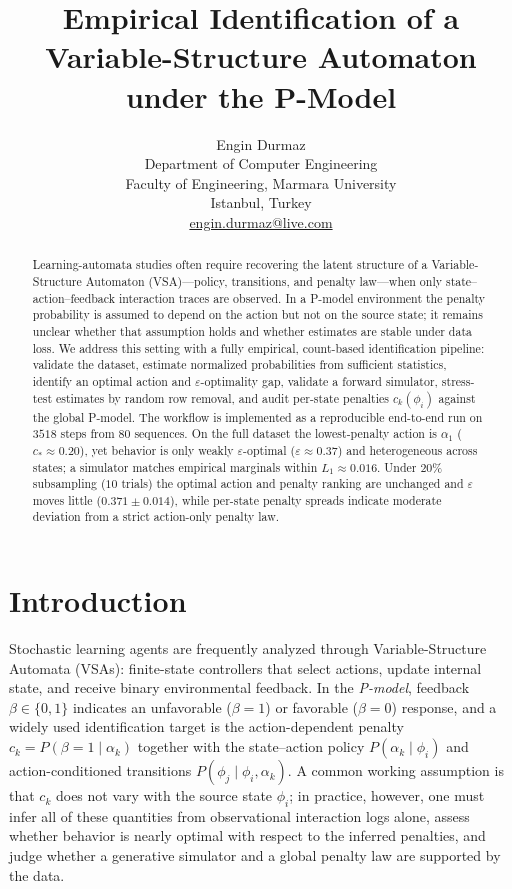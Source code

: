 \documentclass[11pt,a4paper]{article}
\title{Empirical Identification of a Variable-Structure Automaton under the P-Model}
\author{Engin Durmaz\\[0.4em]
  Department of Computer Engineering\\
  Faculty of Engineering, Marmara University\\
  Istanbul, Turkey\\[0.3em]
  \href{mailto:engin.durmaz@live.com}{engin.durmaz@live.com}}
\date{}
\begin{document}
\maketitle

\begin{abstract}
Learning-automata studies often require recovering the latent structure of a
Variable-Structure Automaton (VSA)---policy, transitions, and penalty
law---when only state--action--feedback interaction traces are observed. In a
P-model environment the penalty probability is assumed to depend on the action
but not on the source state; it remains unclear whether that assumption holds and
whether estimates are stable under data loss. We address this setting with a fully
empirical, count-based identification pipeline: validate the dataset, estimate
normalized probabilities from sufficient statistics, identify an optimal action and
$\varepsilon$-optimality gap, validate a forward simulator, stress-test estimates
by random row removal, and audit per-state penalties $c_k(\phi_i)$ against the
global P-model. The workflow is implemented as a reproducible end-to-end run on
$3518$ steps from $80$ sequences. On the full dataset the lowest-penalty action
is $\alpha_1$ ($c_\ast\approx 0.20$), yet behavior is only weakly
$\varepsilon$-optimal ($\varepsilon\approx 0.37$) and heterogeneous across states;
a simulator matches empirical marginals within $L_1\approx 0.016$. Under $20\%$
subsampling ($10$ trials) the optimal action and penalty ranking are unchanged and
$\varepsilon$ moves little ($0.371\pm 0.014$), while per-state penalty spreads
indicate moderate deviation from a strict action-only penalty law.
\end{abstract}

\section{Introduction}

Stochastic learning agents are frequently analyzed through Variable-Structure
Automata (VSAs): finite-state controllers that select actions, update internal
state, and receive binary environmental feedback. In the \emph{P-model}, feedback
$\beta\in\{0,1\}$ indicates an unfavorable ($\beta=1$) or favorable ($\beta=0$)
response, and a widely used identification target is the action-dependent penalty
$c_k=P(\beta{=}1\mid\alpha_k)$ together with the state--action policy
$P(\alpha_k\mid\phi_i)$ and action-conditioned transitions
$P(\phi_j\mid\phi_i,\alpha_k)$. A common working assumption is that $c_k$ does
not vary with the source state $\phi_i$; in practice, however, one must infer
all of these quantities from observational interaction logs alone, assess whether
behavior is nearly optimal with respect to the inferred penalties, and judge whether
a generative simulator and a global penalty law are supported by the data.
\end{document}

